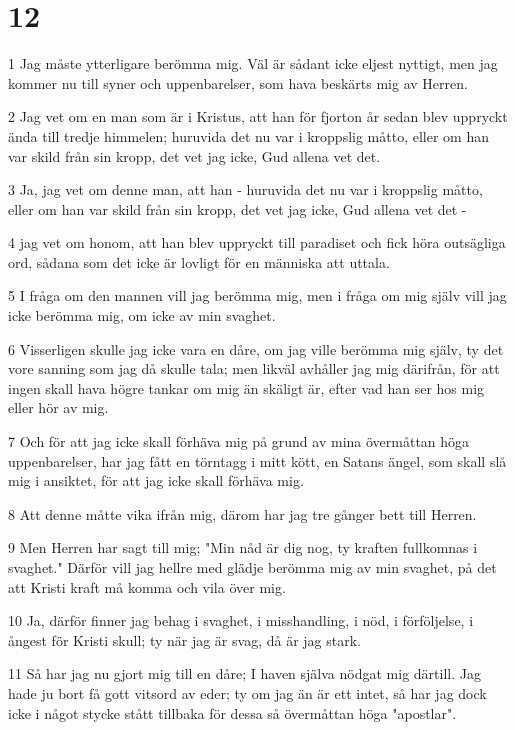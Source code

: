 \chapter{12}

\par 1 Jag måste ytterligare berömma mig. Väl är sådant icke eljest nyttigt, men jag kommer nu till syner och uppenbarelser, som hava beskärts mig av Herren.
\par 2 Jag vet om en man som är i Kristus, att han för fjorton år sedan blev uppryckt ända till tredje himmelen; huruvida det nu var i kroppslig måtto, eller om han var skild från sin kropp, det vet jag icke, Gud allena vet det.
\par 3 Ja, jag vet om denne man, att han - huruvida det nu var i kroppslig måtto, eller om han var skild från sin kropp, det vet jag icke, Gud allena vet det -
\par 4 jag vet om honom, att han blev uppryckt till paradiset och fick höra outsägliga ord, sådana som det icke är lovligt för en människa att uttala.
\par 5 I fråga om den mannen vill jag berömma mig, men i fråga om mig själv vill jag icke berömma mig, om icke av min svaghet.
\par 6 Visserligen skulle jag icke vara en dåre, om jag ville berömma mig själv, ty det vore sanning som jag då skulle tala; men likväl avhåller jag mig därifrån, för att ingen skall hava högre tankar om mig än skäligt är, efter vad han ser hos mig eller hör av mig.
\par 7 Och för att jag icke skall förhäva mig på grund av mina övermåttan höga uppenbarelser, har jag fått en törntagg i mitt kött, en Satans ängel, som skall slå mig i ansiktet, för att jag icke skall förhäva mig.
\par 8 Att denne måtte vika ifrån mig, därom har jag tre gånger bett till Herren.
\par 9 Men Herren har sagt till mig; "Min nåd är dig nog, ty kraften fullkomnas i svaghet." Därför vill jag hellre med glädje berömma mig av min svaghet, på det att Kristi kraft må komma och vila över mig.
\par 10 Ja, därför finner jag behag i svaghet, i misshandling, i nöd, i förföljelse, i ångest för Kristi skull; ty när jag är svag, då är jag stark.
\par 11 Så har jag nu gjort mig till en dåre; I haven själva nödgat mig därtill. Jag hade ju bort få gott vitsord av eder; ty om jag än är ett intet, så har jag dock icke i något stycke stått tillbaka för dessa så övermåttan höga "apostlar".
